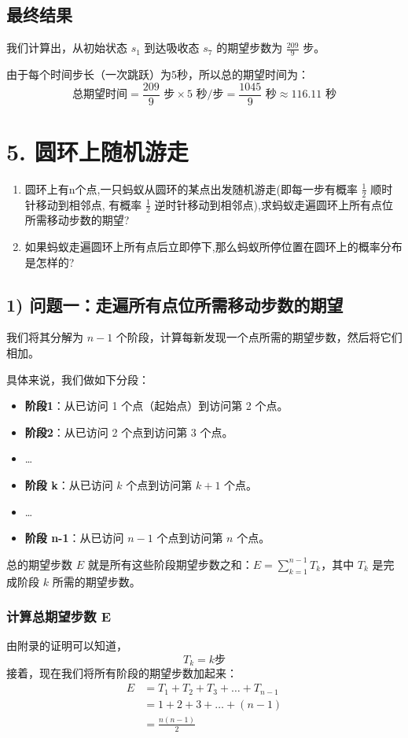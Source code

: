 \documentclass[UTF8]{ctexart}
\begin{document}
\subsection*{最终结果}

我们计算出，从初始状态 $s_1$ 到达吸收态 $s_7$ 的期望步数为 $\frac{209}{9}$ 步。

由于每个时间步长（一次跳跃）为5秒，所以总的期望时间为：
\[
\text{总期望时间} = \frac{209}{9} \text{ 步} \times 5 \text{ 秒/步} = \frac{1045}{9} \text{ 秒} \approx 116.11 \text{ 秒}
\]


\section*{5. 圆环上随机游走}

\begin{enumerate}
    \item 圆环上有n个点,一只蚂蚁从圆环的某点出发随机游走(即每一步有概率 $\frac{1}{2}$ 顺时针移动到相邻点, 有概率 $\frac{1}{2}$ 逆时针移动到相邻点),求蚂蚁走遍圆环上所有点位所需移动步数的期望?
    \item 如果蚂蚁走遍圆环上所有点后立即停下,那么蚂蚁所停位置在圆环上的概率分布是怎样的?
\end{enumerate}
\subsection*{1) 问题一：走遍所有点位所需移动步数的期望}

我们将其分解为 $n-1$ 个阶段，计算每新发现一个点所需的期望步数，然后将它们相加。

具体来说，我们做如下分段：
\begin{itemize}
    \item \textbf{阶段1}：从已访问 1 个点（起始点）到访问第 2 个点。
    \item \textbf{阶段2}：从已访问 2 个点到访问第 3 个点。
    \item \dots
    \item \textbf{阶段 k}：从已访问 $k$ 个点到访问第 $k+1$ 个点。
    \item \dots
    \item \textbf{阶段 n-1}：从已访问 $n-1$ 个点到访问第 $n$ 个点。
\end{itemize}
总的期望步数 $E$ 就是所有这些阶段期望步数之和：$E = \sum_{k=1}^{n-1} T_k$，其中 $T_k$ 是完成阶段 $k$ 所需的期望步数。


\subsubsection*{计算总期望步数 E}
由附录的证明可以知道，\[ T_k = k \text{步} \]
接着，现在我们将所有阶段的期望步数加起来：
\begin{align*}
E &= T_1 + T_2 + T_3 + \dots + T_{n-1} \\
  &= 1 + 2 + 3 + \dots + (n-1)\\
  &=\frac{n(n-1)}{2}
\end{align*}
\end{document}
